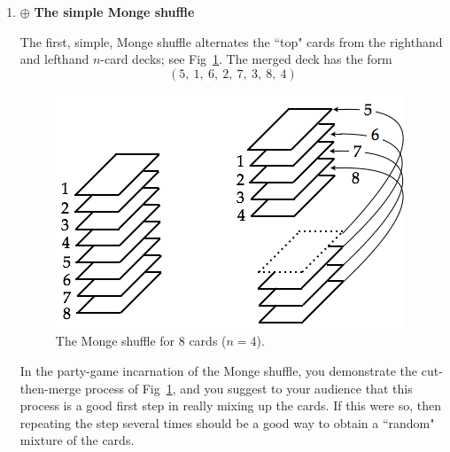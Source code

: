 \begin{enumerate}
  \begin{enumerate}
  \item $\oplus$ {\bf The simple Monge shuffle}

\smallskip

The first, simple, Monge shuffle alternates the ``top" cards from the righthand and lefthand $n$-card decks; see Fig~\ref{fig:suffleMonge}.  The merged deck has the form
\[ (5, \ 1, \ 6, \ 2, \ 7, \ 3, \ 8, \ 4) \]
\begin{figure}[h]
\begin{center}
        \includegraphics[scale=0.4]{FiguresArithmetic/suffleMongeBasic}
        \caption{The Monge shuffle for $8$ cards ($n=4$).}
        \label{fig:suffleMonge}
\end{center}
\end{figure}

In the party-game incarnation of the Monge shuffle, you demonstrate the cut-then-merge process of Fig~\ref{fig:suffleMonge}, and you suggest to your audience that this process is a good first step in really mixing up the cards.  If this were so, then repeating the step several times should be a good way to obtain a ``random" mixture of the cards.

\smallskip


\end{enumerate}
\end{enumerate}
